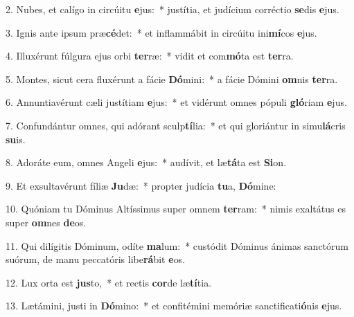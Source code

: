 2. Nubes, et calígo in circúitu \textbf{e}jus:~*  justítia, et judícium corréctio \textbf{se}dis \textbf{e}jus.\

3. Ignis ante ipsum præ\textbf{cé}det:~*  et inflammábit in circúitu ini\textbf{mí}cos \textbf{e}jus.\

4. Illuxérunt fúlgura ejus orbi \textbf{ter}ræ:~*  vidit et com\textbf{mó}ta est \textbf{ter}ra.\

5. Montes, sicut cera fluxérunt a fácie \textbf{Dó}mini:~*  a fácie Dómini \textbf{om}nis \textbf{ter}ra.\

6. Annuntiavérunt cæli justítiam \textbf{e}jus:~*  et vidérunt omnes pópuli \textbf{gló}riam \textbf{e}jus.\

7. Confundántur omnes, qui adórant sculp\textbf{tí}lia:~*  et qui gloriántur in simu\textbf{lá}cris \textbf{su}is.\

8. Adoráte eum, omnes Angeli \textbf{e}jus:~*  audívit, et læ\textbf{tá}ta est \textbf{Si}on.\

9. Et exsultavérunt fíliæ \textbf{Ju}dæ:~*  propter judícia \textbf{tu}a, \textbf{Dó}mine:\

10. Quóniam tu Dóminus Altíssimus super omnem \textbf{ter}ram:~*  nimis exaltátus es super \textbf{om}nes \textbf{de}os.\

11. Qui dilígitis Dóminum, odíte \textbf{ma}lum:~*  custódit Dóminus ánimas sanctórum suórum, de manu peccatóris libe\textbf{rá}bit \textbf{e}os.\

12. Lux orta est \textbf{jus}to,~*  et rectis \textbf{cor}de læ\textbf{tí}tia.\

13. Lætámini, justi in \textbf{Dó}mino:~*  et confitémini memóriæ sanctificati\textbf{ó}nis \textbf{e}jus.\

